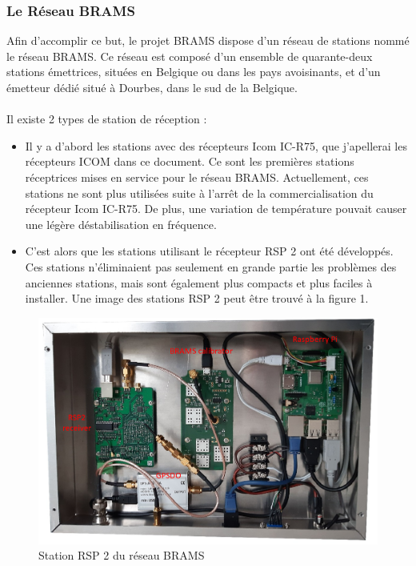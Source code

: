 \documentclass[11pt]{article}
\begin{document}
\subsubsection{Le Réseau BRAMS}

Afin d'accomplir ce but, le projet BRAMS dispose d'un réseau de stations nommé le réseau BRAMS.
Ce réseau est composé d'un ensemble de quarante-deux stations émettrices, situées en Belgique ou dans les pays avoisinants, et d'un émetteur dédié situé à Dourbes, dans le sud de la Belgique.\\
\\
Il existe 2 types de station de réception :
\begin{itemize}
    \item Il y a d'abord les stations avec des récepteurs Icom IC-R75, que j'apellerai les récepteurs ICOM dans ce document.
          Ce sont les premières stations réceptrices mises en service pour le réseau BRAMS.
          Actuellement, ces stations ne sont plus utilisées suite à l'arrêt de la commercialisation du récepteur Icom IC-R75.
          De plus, une variation de température pouvait causer une légère déstabilisation en fréquence.
    \item C'est alors que les stations utilisant le récepteur RSP 2 ont été développés.
          Ces stations n'éliminaient pas seulement en grande partie les problèmes des anciennes stations, mais sont également plus compacts et plus faciles à installer.
          Une image des stations RSP 2 peut être trouvé à la figure 1.
\end{itemize}

\begin{figure}[t]
    \begin{center}
        \includegraphics[scale=0.5]{RPS2.png}
        \caption{Station RSP 2 du réseau BRAMS}
    \end{center}
\end{figure}
\end{document}
